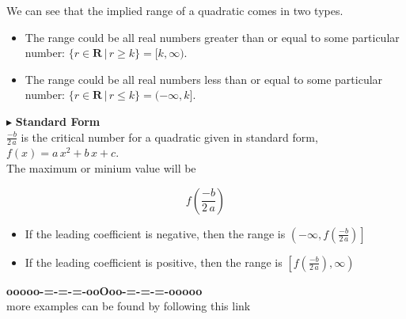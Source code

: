 \documentclass{ximera}
\begin{document}
We can see that the implied range of a quadratic comes in two types.  

\begin{itemize}
\item The range could be all real numbers greater than or equal to some particular number:  $\{ r \in \textbf{R} \, | \, r \geq k \} = [k, \infty)$.
\item The range could be all real numbers less than or equal to some particular number:  $\{ r \in \textbf{R} \, | \, r \leq k \} = (-\infty, k]$.
\end{itemize}






$\blacktriangleright$  \textbf{Standard Form} \\

$\frac{-b}{2 \, a}$ is the critical number for a quadratic given in standard form, $f(x) = a \, x^2 + b \, x + c$. \\

The maximum or minium value will be 

\[
f\left( \frac{-b}{2 \, a} \right)
\]

\begin{itemize}
     \item If the leading coefficient is negative, then the range is $\left(-\infty, f\left( \frac{-b}{2 \, a} \right)\right]$ \\
     \item If the leading coefficient is positive, then the range is $\left[f\left( \frac{-b}{2 \, a} \right), \infty \right)$ \\
\end{itemize}





\begin{center}
\textbf{\textcolor{green!50!black}{ooooo-=-=-=-ooOoo-=-=-=-ooooo}} \\

more examples can be found by following this link\\ 

\end{center}
\end{document}

